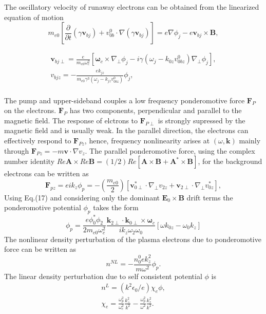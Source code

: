 \documentclass[aip,pop,amsmath,amssymb,showpacs,reprint,floatfix,lengthcheck]{revtex4-1}
\begin{document}
The oscillatory velocity of runaway electrons can be obtained from the linearized equation of motion
\begin{equation}
 m_{e0}[\frac{\partial}{\partial t}(\gamma \textbf{v}_{bj})+v_{0b}^{0}\cdot \nabla (\gamma \textbf{v}_{bj})]=e\nabla\phi_{j}-e\textbf{v}_{bj}\times \textbf{B},
\end{equation}

\begin{eqnarray}
\textbf{v}_{bj \perp}=\frac{e}{m_{e0}\omega_{c}^2}[\boldsymbol{\omega}_{c}\times\nabla_{\perp}\phi_{j}-i\gamma(\omega_{j}-k_{0z}v_{0bz}^{0})\nabla_{\perp}\phi_{j}],\nonumber\\ 
v_{bjz}=-\frac{ek_{jz}}{m_{e0}{\gamma}^3(\omega_{j}-k_{jz}v_{0bz}^{0})}\phi_{j},\nonumber\\
\end{eqnarray}

The pump and upper-sideband couples a low frequency ponderomotive force ${\textbf{F}_{P}}$ on the electrons. ${\textbf{F}_{P}}$ has two components, perpendicular and parallel to the magnetic field. The response of elctrons to  ${\textbf{F}_{P\perp}}$ is strongly supressed by the magnetic field and is usually weak. In the parallel direction, the electrons can effectively respond to ${\textbf{F}_{Pz}}$, hence, frequency nonlinearity arises at $(\omega, \textbf{k})$ mainly through ${\textbf{F}_{Pz}}=-m\textbf{v}\cdot\nabla v_{z}$.
The parallel ponderomotive force, using the complex number identity $Re \textbf{A} \times Re \textbf{B}=(1/2) Re [\textbf{A}\times \textbf{B}+ \textbf{A}^*\times \textbf{B}]$, for the background electrons can be written as 
\begin{equation}
 \textbf{F}_{pz}=ei k_{z}\phi _{p}= -(\frac{m_{e0}}{2})[\textbf{v}_{0\perp}^{*}\cdot\nabla_{\perp}v_{2z}+\textbf{v}_{2\perp}\cdot\nabla_{\perp}v_{0z}^{*}],
\end{equation}
Using Eq.(17) and considering only the dominant $\textbf{E}_{0}\times\textbf{B}$ drift terms the ponderomotive potential $\phi_{p}$ takes the form
\begin{equation}
 \phi_{p}=\frac{e\phi_{0}^*\phi_{2}}{2m_{e0}\omega_{c}^2} \frac{\textbf{k}_{2\perp}\cdot \textbf{k}_{0\perp}\times \boldsymbol{\omega}_{c}}{ik_{z}\omega_{2} \omega_{0}}[\omega k_{0z}-\omega_{0}k_{z}]
\end{equation}
The nonlinear density perturbation of the plasma electrons due to ponderomotive force can be written as
\begin{equation}
 n^{NL}=-\frac{n_{0}^{0}ek_{z}^2}{m\omega^2}\phi_{p}.
\end{equation}
The linear density perturbation due to self consistent potential $\phi$ is 
\begin{eqnarray}
 n^{L}=(k^2 \epsilon_{0}/e)\chi_{e}\phi,\nonumber\\
\chi_{e}=\frac{\omega_{p}^2}{\omega_{c}^2}\frac{k_{\perp}^2}{k^2}-\frac{\omega_{p}^2}{\omega^2}\frac{k_{z}^2}{k^2}.
\end{eqnarray}
 
\end{document}
